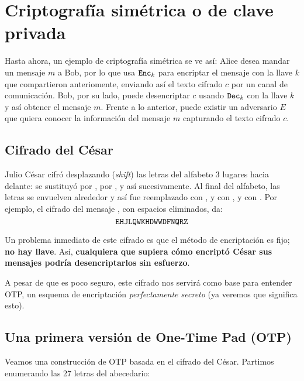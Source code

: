\section[Criptografía simétrica]{Criptografía simétrica o de clave privada}
Hasta ahora, un ejemplo de criptografía simétrica se ve así:
Alice desea mandar un mensaje $m$ a Bob, por lo que usa $\texttt{Enc}_k$ para encriptar el mensaje con la llave $k$ que compartieron anteriomente, enviando así el texto cifrado $c$ por un canal de comunicación. Bob, por su lado, puede desencriptar $c$ usando $\texttt{Dec}_k$ con la llave $k$ y así obtener el mensaje $m$. Frente a lo anterior, puede existir un adversario $E$ que quiera conocer la información del mensaje $m$ capturando el texto cifrado $c$.

\subsection{Cifrado del César}
Julio César cifró desplazando (\textit{shift}) las letras del alfabeto 3 lugares hacia delante:  se sustituyó por ,  por , y así sucesivamente. Al final del alfabeto, las letras se envuelven alrededor y así  fue reemplazado con , y con , y  con . Por ejemplo, el cifrado del mensaje , con espacios eliminados, da:
$$
    \texttt{EHJLQWKHDWWDFNQRZ}
$$

Un problema inmediato de este cifrado es que el método de encriptación es fijo; \textbf{no hay llave}. Así, \textbf{cualquiera que supiera cómo encriptó César sus mensajes podría desencriptarlos sin esfuerzo}. \medbreak

A pesar de que es poco seguro, este cifrado nos servirá como base para entender OTP, un esquema de encriptación \textit{perfectamente secreto} (ya veremos que significa esto).

\subsection{Una primera versión de One-Time Pad (OTP)}
Veamos una construcción de OTP basada en el cifrado del César. Partimos enumerando las 27 letras del abecedario:
\begin{table}[H]
    \centering
    \ttfamily %
\end{table}

